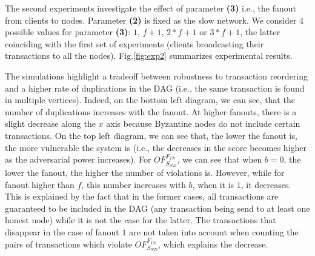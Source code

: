 The second experiments investigate the effect of parameter \textbf{(3)} i.e., the fanout from clients to nodes.
Parameter \textbf{(2)} is fixed as the slow network.
We consider $4$ possible values for parameter \textbf{(3)}: $1$, $f+1$, $2*f+1$ or $3*f+1$, the latter coinciding with the first set of experiments (clients broadcasting their transactions to all the nodes).
Fig.\ref{fig:exp2} summarizes experimental results.

The simulations highlight a tradeoff between robustness to transaction reordering and a higher rate of duplications in the DAG (i.e., the same transaction is found in multiple vertices).
Indeed, on the bottom left diagram, we can see, that the number of duplications increases with the fanout.
At higher fanouts, there is a slight decrease along the $x$ axis because Byzantine nodes do not include certain transactions.
On the top left diagram, we can see that, the lower the fanout is, the more vulnerable the system is (i.e., the decreases in the score becomes higher as the adversarial power increases).
For $OF_{S_{ND}}^{F_{IN}}$, we can see that when $b=0$, the lower the fanout, the higher the number of violations is.
However, while for fanout higher than $f$, this number increases with $b$, when it is $1$, it decreases. 
This is explained by the fact that in the former cases, all transactions are guaranteed to be included in the DAG (any transaction being send to at least one honest node) while it is not the case for the latter.
The transactions that disappear in the case of fanout $1$ are not taken into account when counting the pairs of transactions which violate $OF_{S_{ND}}^{F_{IN}}$, which explains the decrease.





